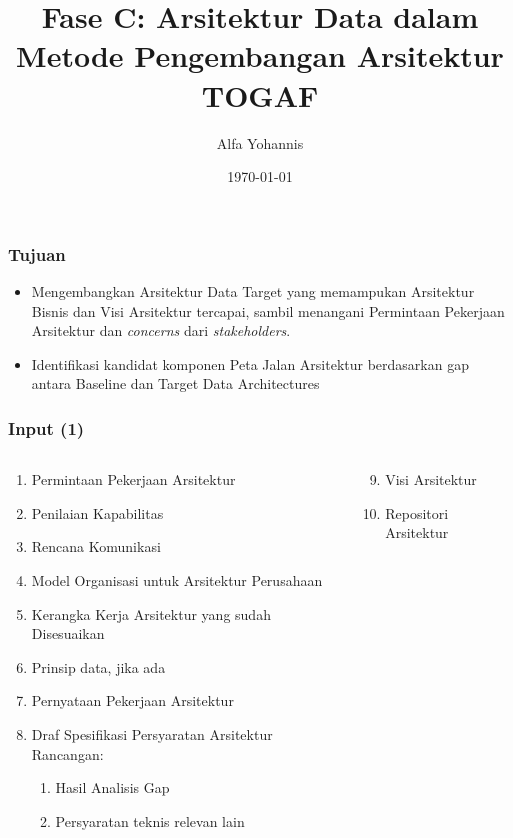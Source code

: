 \documentclass[aspectratio=169]{beamer}
\title{Fase C: Arsitektur Data dalam Metode Pengembangan Arsitektur TOGAF}
\author{Alfa Yohannis}
\date{\today}
\begin{document}
	
	\frame{\titlepage}
	
	\begin{frame}
		\frametitle{Tujuan}
		\begin{itemize}
			\item Mengembangkan Arsitektur Data Target yang memampukan Arsitektur Bisnis dan Visi Arsitektur tercapai, sambil menangani Permintaan Pekerjaan Arsitektur dan \textit{concerns} dari \textit{stakeholders}.
			\item Identifikasi kandidat komponen Peta Jalan Arsitektur berdasarkan gap antara Baseline dan Target Data Architectures
		\end{itemize}
	\end{frame}
	
	\begin{frame}
		\frametitle{Input (1)}
		\begin{columns}
			\begin{column}{0.5\textwidth}
				\begin{center}
					\begin{enumerate}
						\item Permintaan Pekerjaan Arsitektur
						\item Penilaian Kapabilitas
						\item Rencana Komunikasi
						\item Model Organisasi untuk Arsitektur Perusahaan
						\item Kerangka Kerja Arsitektur yang sudah Disesuaikan
						\item Prinsip data, jika ada
						\item Pernyataan Pekerjaan Arsitektur
						\item Draf Spesifikasi Persyaratan Arsitektur Rancangan:
						\begin{enumerate}
							\item Hasil Analisis Gap
							\item Persyaratan teknis relevan lain
						\end{enumerate}
					\end{enumerate}
				\end{center}
			\end{column}
			\begin{column}{0.5\textwidth}
				\begin{center}
					\begin{enumerate}
						\setcounter{enumi}{8}
						\item Visi Arsitektur
						\item Repositori Arsitektur

\end{enumerate}
\end{center}
\end{column}
\end{columns}
\end{frame}
\end{document}

